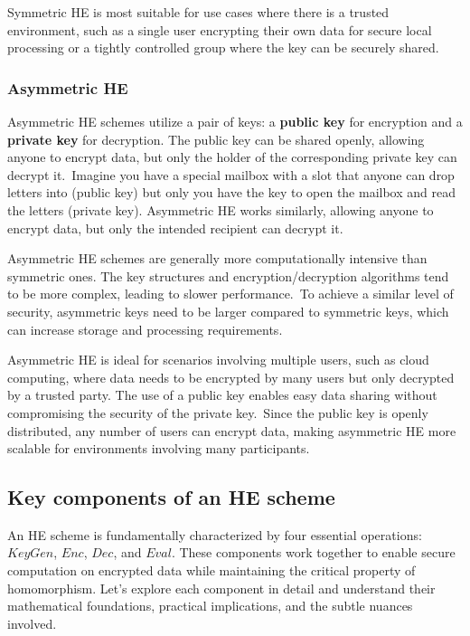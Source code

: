 \documentclass[
  letterpaper,
  DIV=11,
  numbers=noendperiod,
  oneside]{scrartcl}
\begin{document}
Symmetric HE is most suitable for use cases where there is a trusted
environment, such as a single user encrypting their own data for secure
local processing or a tightly controlled group where the key can be
securely shared.

\subsubsection{Asymmetric HE}\label{asymmetric-he}

Asymmetric HE schemes utilize a pair of keys: a \textbf{public key} for
encryption and a \textbf{private key} for decryption. The public key can
be shared openly, allowing anyone to encrypt data, but only the holder
of the corresponding private key can decrypt it.~Imagine you have a
special mailbox with a slot that anyone can drop letters into (public
key) but only you have the key to open the mailbox and read the letters
(private key). Asymmetric HE works similarly, allowing anyone to encrypt
data, but only the intended recipient can decrypt it.

Asymmetric HE schemes are generally more computationally intensive than
symmetric ones. The key structures and encryption/decryption algorithms
tend to be more complex, leading to slower performance.~To achieve a
similar level of security, asymmetric keys need to be larger compared to
symmetric keys, which can increase storage and processing requirements.

Asymmetric HE is ideal for scenarios involving multiple users, such as
cloud computing, where data needs to be encrypted by many users but only
decrypted by a trusted party. The use of a public key enables easy data
sharing without compromising the security of the private key.~Since the
public key is openly distributed, any number of users can encrypt data,
making asymmetric HE more scalable for environments involving many
participants.

\subsection{Key components of an HE
scheme}\label{key-components-of-an-he-scheme}

An HE scheme is fundamentally characterized by four essential
operations: \(KeyGen\), \(Enc\), \(Dec\), and \(Eval\). These components
work together to enable secure computation on encrypted data while
maintaining the critical property of homomorphism. Let's explore each
component in detail and understand their mathematical foundations,
practical implications, and the subtle nuances involved.
\end{document}
